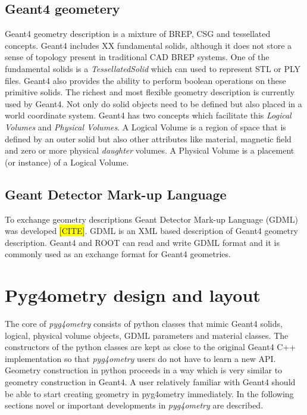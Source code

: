 \documentclass[final,5p,times,twocolumn]{elsarticle}
\begin{document}
\subsection{Geant4 geometery}
Geant4 geometry description is a mixture of BREP, CSG and tessellated concepts. Geant4 includes XX fundamental solids, although it does not store a sense 
of topology present in traditional CAD BREP systems. One of the fundamental solids is a {\em TessellatedSolid} which can used to represent STL or PLY files. 
Geant4 also provides the ability to perform boolean operations on these primitive solids. The richest and most flexible geometry description is currently used by
Geant4. Not only do solid objects need to be defined but also placed in a world coordinate system. Geant4 has two concepts which facilitate this {\it Logical Volumes} 
and {\it Physical Volumes}. A Logical Volume is a region of space  that is defined by an outer solid but also other attributes like material, magnetic field and zero or 
more physical {\it daughter} volumes. A Physical Volume is a placement (or instance) of a Logical Volume.   

\subsection{Geant Detector Mark-up Language} 
To exchange geometry descriptions Geant Detector Mark-up Language (GDML) was developed \colorbox{yellow}{[CITE]}. GDML is an XML based description of 
Geant4 geometry description. Geant4 and ROOT can read and write GDML format and it is commonly used as an exchange format for Geant4 geometries. 

\section{Pyg4ometry design and layout}
The core of {\em pyg4ometry} consists of python classes that mimic Geant4 solids, logical, physical volume objects, GDML parameters and material classes.
The constructors of the python classes are kept as close to the original Geant4 C++ implementation so that {\it pyg4ometry} users do not have to learn 
a new API. Geometry construction in python proceeds in a way which is very similar to geometry construction in Geant4. A user relatively familiar with Geant4
should be able to start creating geometry in pyg4ometry immediately. In the following sections novel or important developments in {\it pyg4ometry} are described.  
\end{document}
